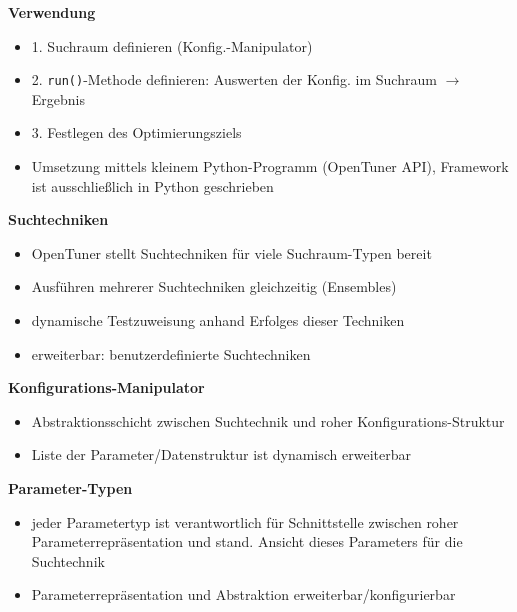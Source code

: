   \begin{frame}
  \textbf{Verwendung}
  \begin{itemize}
    \item 1. Suchraum definieren (Konfig.-Manipulator)
    \item 2. \texttt{run()}-Methode definieren: Auswerten der Konfig. im Suchraum $\rightarrow$ Ergebnis
    \item 3. Festlegen des Optimierungsziels
    \item Umsetzung mittels kleinem Python-Programm (OpenTuner API), Framework ist ausschließlich in 
    Python geschrieben
  \end{itemize}
  \textbf{Suchtechniken}
  \begin{itemize}
    \item OpenTuner stellt Suchtechniken für viele Suchraum-Typen bereit
    \item Ausführen mehrerer Suchtechniken gleichzeitig (Ensembles)
    \item dynamische Testzuweisung anhand Erfolges dieser Techniken
    \item erweiterbar: benutzerdefinierte Suchtechniken
  \end{itemize}
  \end{frame}
  


  \begin{frame}
  \textbf{Konfigurations-Manipulator}
  \begin{itemize}
    \item Abstraktionsschicht zwischen Suchtechnik und roher Konfigurations-Struktur
    \item Liste der Parameter/Datenstruktur ist dynamisch erweiterbar
  \end{itemize}
  \textbf{Parameter-Typen}
  \begin{itemize}
    \item jeder Parametertyp ist verantwortlich für Schnittstelle zwischen roher 
    Parameterrepräsentation und stand. Ansicht dieses Parameters für die Suchtechnik
    \item Parameterrepräsentation und Abstraktion erweiterbar/konfigurierbar
  \end{itemize}
  \end{frame}
  
